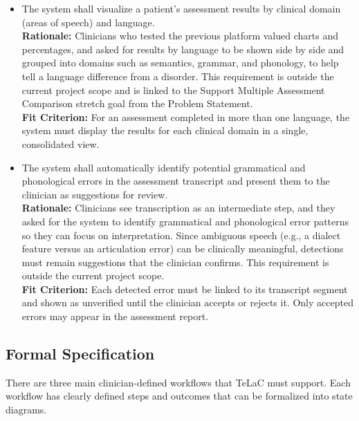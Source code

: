\documentclass[12pt]{article}
\newcounter{reqnum} %
\newcommand{\rthereqnum}{FR\thereqnum}
\begin{document}
\begin{itemize}
\item[\textbf{\rthereqnum} \label{FR_ResultVisualization}:] The system shall visualize a patient’s assessment results by clinical domain (areas of speech) and language.
\\ \textbf{Rationale:} Clinicians who tested the previous platform valued charts and percentages, and asked for results by language to be shown side by side and grouped into domains such as semantics, grammar, and phonology, to help tell a language difference from a disorder. This requirement is outside the current project scope and is linked to the Support Multiple Assessment Comparison stretch goal from the Problem Statement.
\\ \textbf{Fit Criterion:} For an assessment completed in more than one language, the system must display the results for each clinical domain in a single, consolidated view.

\item[\textbf{\rthereqnum} \label{FR_LinguisticPatternDetection}:] The system shall automatically identify potential grammatical and phonological errors in the assessment transcript and present them to the clinician as suggestions for review.
\\ \textbf{Rationale:} Clinicians see transcription as an intermediate step, and they asked for the system to identify grammatical and phonological error patterns so they can focus on interpretation. Since ambiguous speech (e.g., a dialect feature versus an articulation error) can be clinically meaningful, detections must remain suggestions that the clinician confirms. This requirement is outside the current project scope.
\\ \textbf{Fit Criterion:} Each detected error must be linked to its transcript segment and shown as unverified until the clinician accepts or rejects it. Only accepted errors may appear in the assessment report.

\end{itemize}


\subsection{Formal Specification}
There are three main clinician-defined workflows that TeLaC must support. Each workflow has clearly defined steps and outcomes that can be formalized into state diagrams.
\end{document}
